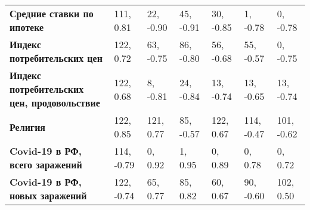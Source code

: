 \documentclass[12pt, a4paper]{article}
\begin{document}
{\begin{center}
\begin{tabular}{lllllll}
\textbf{Средние ставки по ипотеке} & 111, 0.81 & 22, -0.90 & 45, -0.91 & 30, -0.85 & 1, -0.78 & 0, -0.78 \\
\textbf{Индекс потребительских цен} & 122, 0.72 & 63, -0.75 & 86, -0.80 & 56, -0.68 & 55, -0.57 & 0, -0.75 \\
\textbf{Индекс потребительских цен, продовольствие} & 122, 0.68 & 8, -0.81 & 24, -0.84 & 13, -0.74 & 13, -0.65 & 13, -0.74 \\
\textbf{Религия} & 122, 0.85 & 121, 0.77 & 85, -0.57 & 122, 0.67 & 114, -0.47 & 101, -0.62 \\
\textbf{Covid-19 в РФ, всего заражений} & 114, -0.79 & 0, 0.92 & 1, 0.95 & 0, 0.89 & 0, 0.78 & 0, 0.72 \\
\textbf{Covid-19 в РФ, новых заражений} & 122, -0.74 & 65, 0.77 & 85, 0.82 & 60, 0.67 & 90, -0.60 & 102, 0.50 \\ \hline
\end{tabular}
\end{center}
}
\end{document}
